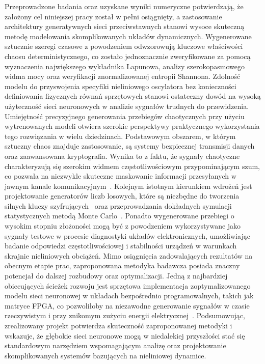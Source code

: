Przeprowadzone badania oraz uzyskane wyniki numeryczne potwierdzają, że założony cel niniejszej pracy został w pełni osiągnięty, a zastosowanie architektury generatywnych sieci przeciwstawnych stanowi wysoce skuteczną metodę modelowania skomplikowanych układów dynamicznych. Wygenerowane sztucznie szeregi czasowe z powodzeniem odwzorowują kluczowe właściwości chaosu deterministycznego, co zostało jednoznacznie zweryfikowane za pomocą wyznaczenia największego wykładnika Lapunowa, analizy szerokopasmowego widma mocy oraz weryfikacji znormalizowanej entropii Shannona. 
Zdolność modelu do przyswojenia specyfiki nieliniowego oscylatora bez konieczności definiowania fizycznych równań sprzętowych stanowi ostateczny dowód na wysoką użyteczność sieci neuronowych w analizie sygnałów trudnych do przewidzenia. 
Umiejętność precyzyjnego generowania przebiegów chaotycznych przy użyciu wytrenowanych modeli otwiera szerokie perspektywy praktycznego wykorzystania tego rozwiązania w wielu dziedzinach.
Podstawowym obszarem, w którym sztuczny chaos znajduje zastosowanie, są systemy bezpiecznej transmisji danych oraz zaawansowana kryptografia. Wynika to z faktu, że sygnały chaotyczne charakteryzują się szerokim widmem częstotliwościowym przypominającym szum, co pozwala na niezwykle skuteczne maskowanie informacji przesyłanych w jawnym kanale komunikacyjnym~\cite{kryptografia}.
Kolejnym istotnym kierunkiem wdrożeń jest projektowanie generatorów liczb losowych, które są niezbędne do tworzenia silnych kluczy szyfrujących~\cite{klucze} oraz przeprowadzania dokładnych symulacji statystycznych metodą Monte Carlo~\cite{monte}. Ponadto wygenerowane przebiegi o wysokim stopniu złożoności mogą być z powodzeniem wykorzystywane jako sygnały testowe w procesie diagnostyki układów elektronicznych, umożliwiając badanie odpowiedzi częstotliwościowej i stabilności urządzeń w warunkach skrajnie nieliniowych obciążeń. Mimo osiągnięcia zadowalających rezultatów na obecnym etapie prac, zaproponowana metodyka badawcza posiada znaczny potencjał do dalszej rozbudowy oraz optymalizacji. Jedną z najbardziej obiecujących ścieżek rozwoju jest sprzętowa implementacja zoptymalizowanego modelu sieci neuronowej w układach bezpośrednio programowalnych, takich jak matryce FPGA, co pozwoliłoby na niezawodne generowanie sygnałów w czasie rzeczywistym i przy znikomym zużyciu energii elektrycznej~\cite{FPGA1, FPGA2}.
Podsumowując, zrealizowany projekt potwierdza skuteczność zaproponowanej metodyki i wskazuje, że głębokie sieci neuronowe mogą w niedalekiej przyszłości stać się standardowym narzędziem wspomagającym analizę oraz projektowanie skomplikowanych systemów bazujących na nieliniowej dynamice.


